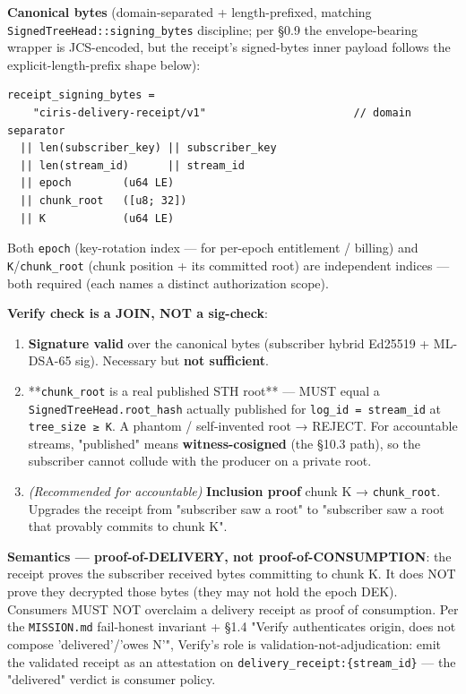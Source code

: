 \documentclass[11pt]{article}
\begin{document}
\textbf{Canonical bytes} (domain-separated + length-prefixed, matching \texttt{SignedTreeHead::signing\_bytes} discipline; per §0.9 the envelope-bearing wrapper is JCS-encoded, but the receipt's signed-bytes inner payload follows the explicit-length-prefix shape below):


\begin{lstlisting}
receipt_signing_bytes =
    "ciris-delivery-receipt/v1"                       // domain separator
  || len(subscriber_key) || subscriber_key
  || len(stream_id)      || stream_id
  || epoch        (u64 LE)
  || chunk_root   ([u8; 32])
  || K            (u64 LE)
\end{lstlisting}

Both \texttt{epoch} (key-rotation index — for per-epoch entitlement / billing) and \texttt{K}/\texttt{chunk\_root} (chunk position + its committed root) are independent indices — both required (each names a distinct authorization scope).


\textbf{Verify check is a JOIN, NOT a sig-check}:


\begin{enumerate}\setlength\itemsep{0pt}
\item \textbf{Signature valid} over the canonical bytes (subscriber hybrid Ed25519 + ML-DSA-65 sig). Necessary but \textbf{not sufficient}.
\item **\texttt{chunk\_root} is a real published STH root** — MUST equal a \texttt{SignedTreeHead.root\_hash} actually published for \texttt{log\_id = stream\_id} at \texttt{tree\_size ≥ K}. A phantom / self-invented root → REJECT. For accountable streams, "published" means \textbf{witness-cosigned} (the §10.3 path), so the subscriber cannot collude with the producer on a private root.
\item \textit{(Recommended for accountable)} \textbf{Inclusion proof} chunk K → \texttt{chunk\_root}. Upgrades the receipt from "subscriber saw a root" to "subscriber saw a root that provably commits to chunk K".
\end{enumerate}


\textbf{Semantics — proof-of-DELIVERY, not proof-of-CONSUMPTION}: the receipt proves the subscriber received bytes committing to chunk K. It does NOT prove they decrypted those bytes (they may not hold the epoch DEK). Consumers MUST NOT overclaim a delivery receipt as proof of consumption. Per the \texttt{MISSION.md} fail-honest invariant + §1.4 "Verify authenticates origin, does not compose 'delivered'/'owes N'", Verify's role is validation-not-adjudication: emit the validated receipt as an attestation on \texttt{delivery\_receipt:\{stream\_id\}} — the "delivered" verdict is consumer policy.
\end{document}
